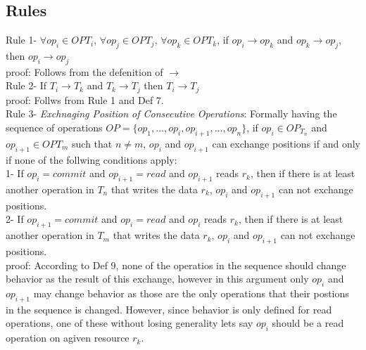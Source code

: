 \documentclass[a4paper, 11pt]{article}
\begin{document}

\subsection{Rules}

Rule 1- $\forall op_i \in  OP{T_i}$, $\forall op_j \in  OP{T_j}$, $\forall op_k \in  OP{T_k}$, if $op_i \rightarrow op_k$ and  $op_k \rightarrow op_j$, then $op_i \rightarrow op_j$ \\

proof: Follows from the defenition of $\rightarrow$ \\


Rule 2- If $T_i \rightarrow T_k$ and $T_k \rightarrow T_j$ then $T_i \rightarrow T_j$ \\

proof: Follws from Rule 1 and Def 7. \\ 

Rule 3- \emph{Exchnaging Position of Consecutive Operations}: Formally having the sequence of operations $OP = \{op_1,...,op_i,op_{i+1},...,op_n\}$, if $op_i \in OP_{T_n}$ and $op_{i+1} \in OP{T_m}$ such that $ n\neq m$, $op_i$ and $op_{i+1}$ can exchange positions if and only if none of the follwing conditions apply:\\

\hspace{8mm} 1- If $op_i = {commit}$ and $op_{i+1} = {read}$ and $op_{i+1}$ reads $r_k$, then if there is at least another operation in $T_n$ that writes the data $r_k$, $op_i$ and $op_{i+1}$ can not exchange positions.\\ 

\hspace{8mm} 2- If $op_{i+1} = {commit}$ and $op_{i} = {read}$ and $op_{i}$ reads $r_k$, then if there is at least another operation in $T_m$ that writes the data $r_k$, $op_i$ and $op_{i+1}$ can not exchange positions.\\ 


proof: According to Def 9, none of the operatios in the sequence should change behavior as the result of this exchange, however in this argument only $op_i$ and $op_{i+1}$ may change behavior as those are the only operations that their postions in the sequence is changed. However, since behavior is only defined for read operations, one of these without losing generality lets say $op_i$ should be a read operation on agiven resource $r_k$.\\
\end{document}
